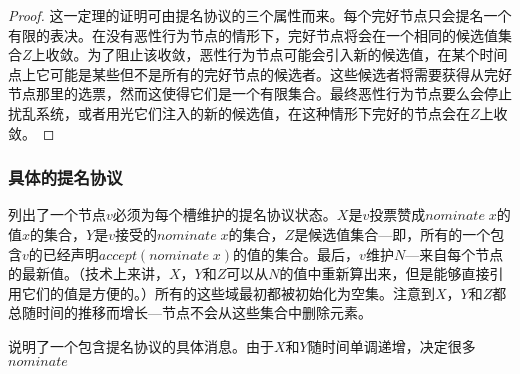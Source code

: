 \begin{proof}
	这一定理的证明可由提名协议的三个属性而来。每个完好节点只会提名一个有限的表决。在没有恶性行为节点的情形下，完好节点将会在一个相同的候选值集合$Z$上收敛。为了阻止该收敛，恶性行为节点可能会引入新的候选值，在某个时间点上它可能是某些但不是所有的完好节点的候选者。这些候选者将需要获得从完好节点那里的选票，然而这使得它们是一个有限集合。最终恶性行为节点要么会停止扰乱系统，或者用光它们注入的新的候选值，在这种情形下完好的节点会在$Z$上收敛。
\end{proof}

\subsubsection{具体的提名协议}

列出了一个节点$v$必须为每个槽维护的提名协议状态。$X$是$v$投票赞成$nominate\;x$的值$x$的集合，$Y$是$v$接受的$nominate\;x$的集合，$Z$是候选值集合---即，所有的一个包含$v$的{\quorum}已经声明$accept(nominate\;x)$的值的集合。最后，$v$维护$N$---来自每个节点的最新值。（技术上来讲，$X$，$Y$和$Z$可以从$N$的值中重新算出来，但是能够直接引用它们的值是方便的。）所有的这些域最初都被初始化为空集。注意到$X$，$Y$和$Z$都总随时间的推移而增长---节点不会从这些集合中删除元素。

说明了一个包含提名协议的具体消息。由于$X$和$Y$随时间单调递增，决定很多$nominate$